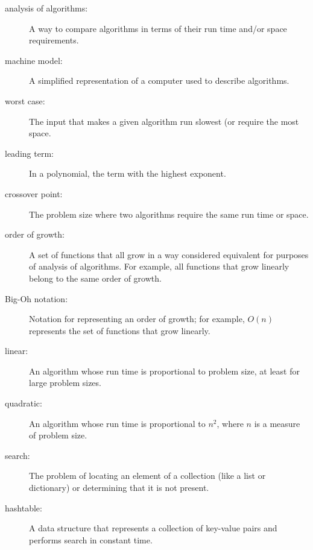 \documentclass[10pt]{book}
\begin{document}
\begin{description}

\item[analysis of algorithms:] A way to compare algorithms in terms of
their run time and/or space requirements.

\item[machine model:] A simplified representation of a computer used
to describe algorithms.

\item[worst case:] The input that makes a given algorithm run slowest (or
require the most space.

\item[leading term:] In a polynomial, the term with the highest exponent.

\item[crossover point:] The problem size where two algorithms require
the same run time or space. 

\item[order of growth:] A set of functions that all grow in a way
considered equivalent for purposes of analysis of algorithms. 
For example, all functions that grow linearly belong to the same
order of growth.

\item[Big-Oh notation:] Notation for representing an order of growth;
for example, $O(n)$ represents the set of functions that grow
linearly. 

\item[linear:] An algorithm whose run time is proportional to
problem size, at least for large problem sizes.

\item[quadratic:] An algorithm whose run time is proportional to
$n^2$, where $n$ is a measure of problem size.

\item[search:] The problem of locating an element of a collection
(like a list or dictionary) or determining that it is not present.

\item[hashtable:] A data structure that represents a collection of
key-value pairs and performs search in constant time.

\end{description}


\printindex

\clearemptydoublepage
\end{document}
